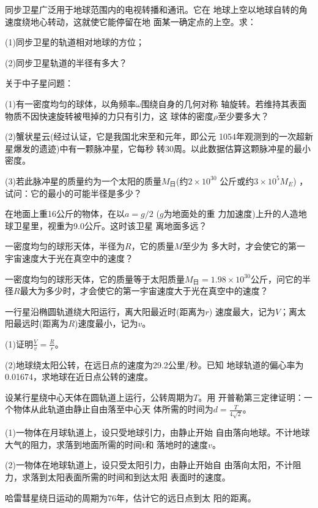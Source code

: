 \begin{exercises}
\exercise 同步卫星广泛用于地球范围内的电视转播和通讯。它在
地球上空以地球自转的角速度绕地心转动，这就使它能停留在地
面某一确定点的上空。求：

(1)同步卫星的轨道相对地球的方位；

(2)同步卫星轨道的半径有多大？

\exercise 关于中子星问题：

(1)有一密度均匀的球体，以角频率$ \omega $围绕自身的几何对称
轴旋转。若维持其表面物质不因快速旋转被甩掉的力只有引力，这
球体的密度$ \rho $至少要多大？

(2)蟹状星云(经过认证，它是我国北宋至和元年，即公元
1054年观测到的一次超新星爆发的遗迹)中有一颗脉冲星，它每秒
转30周。以此数据估算这颗脉冲星的最小密度。

(3)若此脉冲星的质量约为一个太阳的质量$ M _ \text{日} $(约$  2 \times 1 0 ^ { 3 0 }  $
公斤或约$  3 \times 1 0 ^ { 5 } M _ { E }  $)  ，试问：它的最小的可能半径是多少？

\exercise 在地面上重16公斤的物体，在以$  a = g / 2 $ ($ g $为地面处的重
力加速度)上升的人造地球卫星里，视重为9.0公斤。这时该卫星
离地面多远？

\exercise 一密度均匀的球形天体，半径为$ R $，它的质量$ M $至少为
多大时，才会使它的第一宇宙速度大于光在真空中的速度？

\exercise 一密度均匀的球形天体，它的质量等于太阳质量$ M _ \text{日} =
1. 9 8 \times 1 0 ^ { 3 0 }  $公斤，问它的半径$ R $最大为多少时，才会使它的第一宇宙速度大于光在真空中的速度？

\exercise 一行星沿椭圆轨道绕大阳运行，离大阳最近时(距离为$ r $)
速度最大，记为$ V $；离太阳最远时(距离为$ R $)速度最小，记为$ v $。

(1)证明$ \frac { V } { v } = \frac { R } { r }   $。

(2)地球绕太阳公转，在远日点的速度为29.2公里/秒。已知
地球轨道的偏心率为0.01674，求地球在近日点公转的速度。

\exercise 设某行星绕中心天体在圆轨道上运行，公转周期为$ T $。用
开普勒第三定律证明：一个物体从此轨道由静止自由落至中心天
体所需的时间为$d = \frac { T } { 4 \sqrt { 2 } } $。

\exercise (1)一物体在月球轨道上，设只受地球引力，由静止开始
自由落向地球。不计地球大气的阻力，求落到地面所需的时间t和
落地时的速度$ v $。

(2)一物体在地球轨道上，设只受太阳引力，由静止开始自
由落向太阳，不计阻力，求落到太阳表面所需的时间和到达太阳
表面时的速度。

\exercise 哈雷彗星绕日运动的周期为76年，估计它的远日点到太
阳的距离。

\end{exercises}